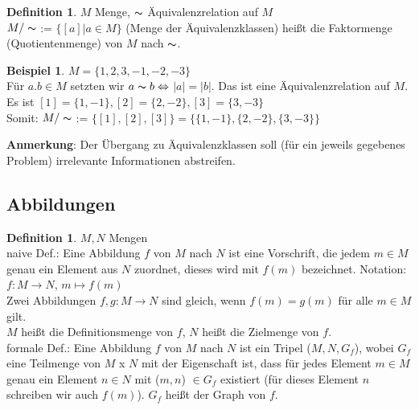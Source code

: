 \documentclass[10pt,a4paper,numbers=endperiod]{scrartcl}
\theoremstyle{definition}
\newtheorem{defi}[satz]{Definition}
\newtheorem{bsp}[satz]{Beispiel}
\begin{document}
\begin{defi}
	$M$ Menge, $\thicksim$ Äquivalenzrelation auf $M$\\
	$M /  \thicksim$ := $\{[a]|a \in M\}$ (Menge der Äquivalenzklassen) heißt die Faktormenge (Quotientenmenge) von $M$ nach $\thicksim$.
\end{defi}

\begin{bsp}
	$M = \{1,2,3,-1,-2,-3\}$\\
	Für $a.b \in M$ setzten wir $a \thicksim b \Leftrightarrow$ $|a| = |b|$. Das ist eine Äquivalenzrelation auf $M$.\\
	Es ist $[1] = \{1,-1\}, [2] = \{2,-2\}, [3] = \{3, -3\}$\\
	Somit: $M / \thicksim$ := $\{[1], [2], [3]\} = \{\{1,-1\}, \{2,-2\}, \{3,-3\}\}$
\end{bsp}
\textbf{Anmerkung}: Der Übergang zu Äquivalenzklassen soll (für ein jeweils gegebenes Problem) irrelevante Informationen abstreifen.

\subsection{Abbildungen}

\begin{defi}
	$M, N$ Mengen\\
	naive Def.: Eine Abbildung $f$ von $M$ nach $N$ ist eine Vorschrift, die jedem $m \in M$ genau ein Element aus $N$ zuordnet, dieses wird mit $f(m)$ bezeichnet. Notation: $f: M \rightarrow N$, $m \mapsto f(m)$\\
	Zwei Abbildungen $f,g: M \rightarrow N$ sind gleich, wenn $f(m) = g(m)$ für alle $m \in M$ gilt.\\
	$M$ heißt die Definitionsmenge von $f$, $N$ heißt die Zielmenge von $f$.\\
	
	formale Def.: Eine Abbildung $f$ von $M$ nach $N$ ist ein Tripel ($M,N, G_f$), wobei $G_f$ eine Teilmenge von $M$ x $N$ mit der Eigenschaft ist, dass für jedes Element $m \in M$ genau ein Element $n \in N$ mit ($m,n$) $\in G_f$ existiert (für dieses Element $n$ schreiben wir auch $f(m)$). $G_f$ heißt der Graph von $f$.
\end{defi}
\end{document}
